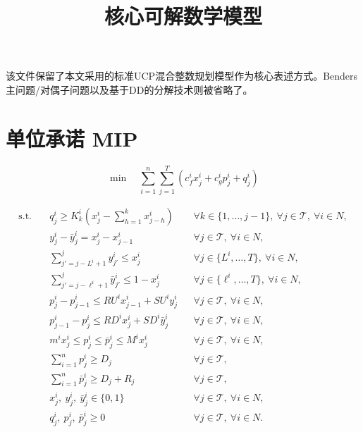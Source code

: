 \documentclass{article}
\title{核心可解数学模型}
\author{}
\date{}
\begin{document}
\maketitle

该文件保留了本文采用的标准UCP混合整数规划模型作为核心表述方式。Benders主问题/对偶子问题以及基于DD的分解技术则被省略了。

\section{单位承诺 MIP}

\begin{equation}
\min \quad \sum_{i=1}^{n} \sum_{j=1}^{T} \left(c_f^i x_j^i + c_g^i p_j^i + q_j^i\right)
\tag{1a}
\end{equation}

\begin{equation}
\begin{aligned}
\text{s.t.}\quad
& q_j^i \ge K_k^i\left(x_j^i - \sum_{h=1}^{k} x_{j-h}^i\right)
&& \forall k\in\{1,\dots,j-1\},\ \forall j\in\mathcal{T},\ \forall i\in N, \\
& y_j^i - \bar y_j^i = x_j^i - x_{j-1}^i
&& \forall j\in\mathcal{T},\ \forall i\in N, \\
& \sum_{j'=j-L^i+1}^{j} y_{j'}^i \le x_j^i
&& \forall j\in\{L^i,\dots,T\},\ \forall i\in N, \\
& \sum_{j'=j-\ell^i+1}^{j} \bar y_{j'}^i \le 1 - x_j^i
&& \forall j\in\{\ell^i,\dots,T\},\ \forall i\in N, \\
& p_j^i - p_{j-1}^i \le RU^i x_{j-1}^i + SU^i y_j^i
&& \forall j\in\mathcal{T},\ \forall i\in N, \\
& p_{j-1}^i - p_j^i \le RD^i x_j^i + SD^i \bar y_j^i
&& \forall j\in\mathcal{T},\ \forall i\in N, \\
& m^i x_j^i \le p_j^i \le \bar p_j^i \le M^i x_j^i
&& \forall j\in\mathcal{T},\ \forall i\in N, \\
& \sum_{i=1}^{n} p_j^i \ge D_j
&& \forall j\in\mathcal{T}, \\
& \sum_{i=1}^{n} \bar p_j^i \ge D_j + R_j
&& \forall j\in\mathcal{T}, \\
& x_j^i,\ y_j^i,\ \bar y_j^i \in \{0,1\}
&& \forall j\in\mathcal{T},\ \forall i\in N, \\
& q_j^i,\ p_j^i,\ \bar p_j^i \ge 0
&& \forall j\in\mathcal{T},\ \forall i\in N.
\end{aligned}
\end{equation}
\end{document}
